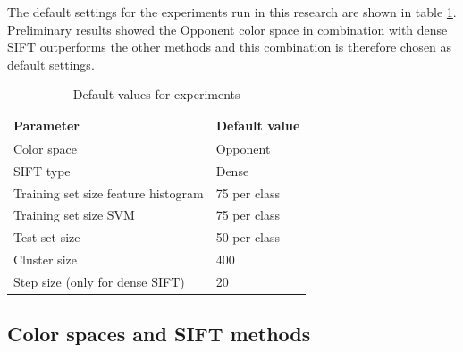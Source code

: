 The default settings for the experiments run in this research are shown in table \ref{tab:default}. Preliminary results showed the Opponent color space in combination with dense SIFT outperforms the other methods and this combination is therefore chosen as default settings.

\begin{table}[H]
\begin{tabular}{|l|l|}
\hline
\textbf{Parameter} & \textbf{Default value}\\
\hline
Color space & Opponent\\
SIFT type & Dense\\
Training set size feature histogram & 75 per class\\
Training set size SVM & 75 per class\\
Test set size & 50 per class \\
Cluster size & 400 \\
Step size (only for dense SIFT) & 20\\
\hline
\end{tabular}
\caption{Default values for experiments}
\label{tab:default}
\end{table}

\subsection{Color spaces and SIFT methods}


